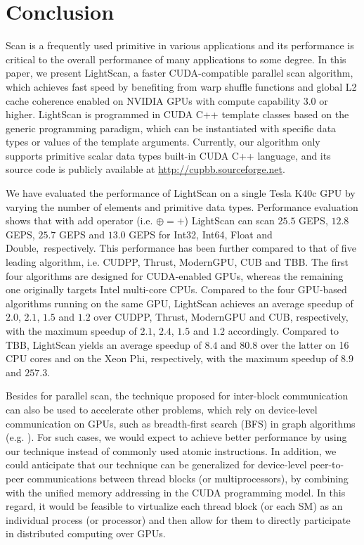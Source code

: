 \documentclass[article]{elsarticle}
\renewcommand{\hl}[1]{#1}
\begin{document}
{\section{Conclusion}
Scan is a frequently used primitive in various applications and its performance is critical to the overall performance of many applications to some degree. In this paper, we present LightScan, a faster CUDA-compatible parallel scan algorithm, which achieves fast speed by benefiting from warp shuffle functions and global L2 cache coherence enabled on NVIDIA GPUs with compute capability 3.0 or higher. \hl{LightScan is programmed in CUDA C++ template classes based on the generic programming paradigm, which can be instantiated with specific data types or values of the template arguments. Currently, our algorithm only supports primitive scalar data types built-in CUDA C++ language, and its source code is publicly available at \url{http://cupbb.sourceforge.net}.}

We have evaluated the performance of LightScan on a single Tesla K40c GPU by varying the number of elements and primitive data types. Performance evaluation shows that with add operator (i.e. $\oplus = +$) LightScan can scan $25.5$ GEPS, $12.8$ GEPS, $25.7$ GEPS and $13.0$ GEPS for Int32, Int64, Float and Double,\ respectively. This performance has been further compared to that of five leading algorithm, i.e. CUDPP, Thrust, ModernGPU, CUB and TBB. The first four algorithms are designed for CUDA-enabled GPUs, whereas the remaining one originally targets Intel multi-core CPUs. Compared to the four GPU-based algorithms running on the same GPU, LightScan achieves an average speedup of $2.0$, $2.1$, $1.5$ and $1.2$ over CUDPP, Thrust, ModernGPU and CUB, respectively, with the maximum speedup of $2.1$, $2.4$, $1.5$ and $1.2$ accordingly. Compared to TBB, LightScan yields an average speedup of $8.4$ and $80.8$ over the latter on 16 CPU cores and on the Xeon Phi, respectively, with the maximum speedup of $8.9$ and $257.3$.

Besides for parallel scan, the technique proposed for inter-block communication can also be used to accelerate other problems, which rely on device-level communication on GPUs, such as breadth-first search (BFS) in graph algorithms (e.g. \cite{luo2010effective}). For such cases, we would expect to achieve better performance by using our technique instead of commonly used atomic instructions. In addition, we could anticipate that our technique can be generalized for device-level peer-to-peer communications between thread blocks (or multiprocessors), by combining with the unified memory addressing in the CUDA programming model. In this regard, it would be feasible to virtualize each thread block (or each SM) as an individual process (or processor) and then allow for them to directly participate in distributed computing over GPUs.
}
\end{document}
